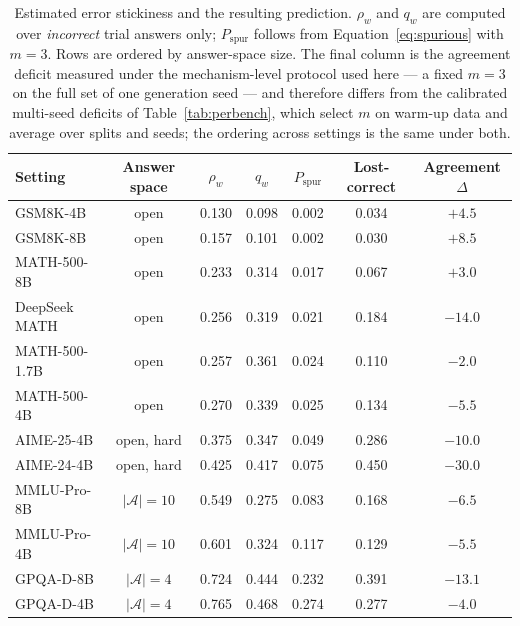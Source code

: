 \documentclass[acmsmall]{acmart}
\newcommand{\up}[1]{\textcolor{gd}{#1}}
\newcommand{\dn}[1]{\textcolor{bd}{#1}}
\theoremstyle{acmdefinition}%
\theoremstyle{acmplain}}{}%
\begin{document}
\begin{table}[t]
\caption{Estimated error stickiness and the resulting prediction. $\rho_w$ and $q_w$ are computed over \emph{incorrect} trial answers only; $P_{\mathrm{spur}}$ follows from Equation~\eqref{eq:spurious} with $m=3$. Rows are ordered by answer-space size. The final column is the agreement deficit measured under the mechanism-level protocol used here --- a fixed $m=3$ on the full set of one generation seed --- and therefore differs from the calibrated multi-seed deficits of Table~\ref{tab:perbench}, which select $m$ on warm-up data and average over splits and seeds; the ordering across settings is the same under both.}
\label{tab:stickiness}
\small
\setlength{\tabcolsep}{5pt}
\begin{tabular}{@{}lcccccc@{}}
\toprule
\textbf{Setting} & \textbf{Answer space} & $\rho_w$ & $q_w$ & $P_{\mathrm{spur}}$ & \textbf{Lost-correct} & \textbf{Agreement} $\Delta$ \\
\midrule
GSM8K-4B      & open        & 0.130 & 0.098 & 0.002 & 0.034 & \up{$+4.5$} \\
GSM8K-8B      & open        & 0.157 & 0.101 & 0.002 & 0.030 & \up{$+8.5$} \\
MATH-500-8B   & open        & 0.233 & 0.314 & 0.017 & 0.067 & \up{$+3.0$} \\
DeepSeek MATH & open        & 0.256 & 0.319 & 0.021 & 0.184 & \dn{$-14.0$} \\
MATH-500-1.7B & open        & 0.257 & 0.361 & 0.024 & 0.110 & $-2.0$ \\
MATH-500-4B   & open        & 0.270 & 0.339 & 0.025 & 0.134 & \dn{$-5.5$} \\
AIME-25-4B    & open, hard  & 0.375 & 0.347 & 0.049 & 0.286 & \dn{$-10.0$} \\
AIME-24-4B    & open, hard  & 0.425 & 0.417 & 0.075 & 0.450 & \dn{$-30.0$} \\
MMLU-Pro-8B   & $|\mathcal{A}|=10$ & 0.549 & 0.275 & 0.083 & 0.168 & \dn{$-6.5$} \\
MMLU-Pro-4B   & $|\mathcal{A}|=10$ & 0.601 & 0.324 & 0.117 & 0.129 & \dn{$-5.5$} \\
GPQA-D-8B     & $|\mathcal{A}|=4$  & 0.724 & 0.444 & 0.232 & 0.391 & \dn{$-13.1$} \\
GPQA-D-4B     & $|\mathcal{A}|=4$  & 0.765 & 0.468 & 0.274 & 0.277 & $-4.0$ \\
\bottomrule
\end{tabular}
\end{table}
\end{document}

